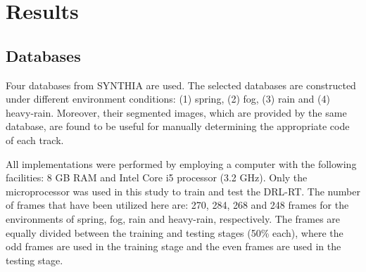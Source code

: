 \documentclass{svproc}
\newcommand{\tl}[1]{\textcolor{blue} {TL: #1 :TL} }
\begin{document}
%
%




\section{Results}
\subsection{Databases} 
Four databases from SYNTHIA \cite{Ros2016TheSYNTHIA} are used. The selected databases are constructed under different environment conditions: (1) spring, (2) fog, (3) rain and (4) heavy-rain. Moreover, their segmented images, which are provided by the same database, are found to be useful for manually determining the appropriate code of each track. 

All implementations were performed by employing a computer with the following facilities: 8 GB RAM and Intel Core i5 processor (3.2 GHz). Only the microprocessor was used in this study to train and test the DRL-RT. The number of frames that have been utilized here are: 270, 284, 268 and 248 frames for the environments of spring, fog, rain and heavy-rain, respectively. The frames are equally divided between the training and testing stages (50\% each), where the odd frames are used in the training stage and the even frames are used in the testing stage.
\end{document}
